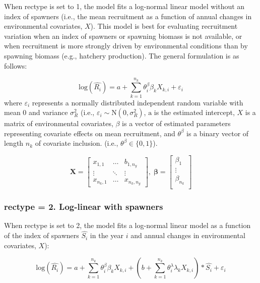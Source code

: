\documentclass[
]{article}
\begin{document}
When rectype is set to 1, the model fits a log-normal linear model
without an index of spawners (i.e., the mean recruitment as a function
of annual changes in environmental covariates, \({X}\)). This model is
best for evaluating recruitment variation when an index of spawners or
spawning biomass is not available, or when recruitment is more strongly
driven by environmental conditions than by spawning biomass (e.g.,
hatchery production). The general formulation is as follows:

\[ \mathrm{log}(\hat{R_i})= a+\sum_{k=1}^{n_k}{\theta_i^{\beta}\beta_k X_{k,i}}+\varepsilon_i \]
where \(\varepsilon_i\) represents a normally distributed independent
random variable with mean 0 and variance \(\sigma^2_R\) (i.e.,
\(\varepsilon_i\sim \mathrm N(0,\sigma^2_R)\), \(\mathrm a\) is the
estimated intercept, \({X}\) is a matrix of environmental covariates,
\(\beta\) is a vector of estimated parameters representing covariate
effects on mean recruitment, and \({\theta^{\beta}}\) is a binary vector
of length \(n_k\) of covariate inclusion. (i.e.,
\({\theta^{\beta}} \in \{0,1 \}\)).

\[\mathbf{X} = \left[\begin{array}
{rrr}
x_{1,1} & \dots  & b_{1,n_y} \\
\vdots & \ddots & \vdots \\
x_{n_k,1} & \dots  & x_{n_k,n_y} 
\end{array}\right]
,\; \mathbf{\beta} = \left[\begin{array}
{rrr}
\beta_1 \\
\vdots  \\
\beta_{n_k} \\
\end{array}\right]
\]

\hypertarget{rectype-2.-log-linear-with-spawners}{%
\subsubsection{rectype = 2. Log-linear with
spawners}\label{rectype-2.-log-linear-with-spawners}}

When rectype is set to 2, the model fits a log-normal linear model as a
function of the index of spawners \(\hat{S_i}\) in the year \(i\) and
annual changes in environmental covariates, \({X}\)):

\[\mathrm{log}(\hat{R_i})= a + \sum_{k=1}^{n_k}{\theta_i^{\beta}\beta_k X_{k,i}}+ (b+\sum_{k=1}^{n_k}{\theta_i^{\lambda}\lambda_k X_{k,i}})* \hat{S_i}+\varepsilon_i\]
\end{document}
